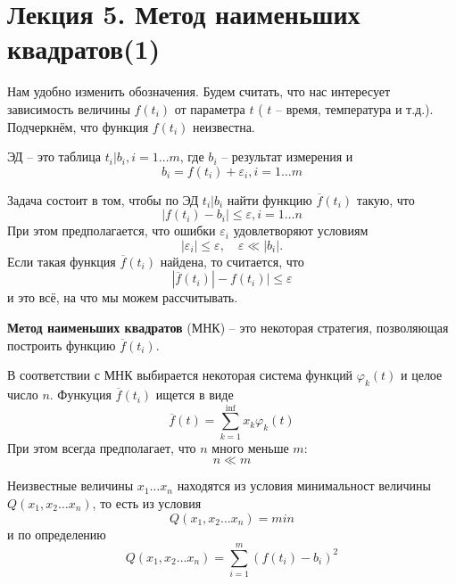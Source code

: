 \section*{Лекция 5. Метод наименьших квадратов(1)}
\label{lecture5}
Нам удобно изменить обозначения. Будем считать, что нас интересует зависимость величины $f(t_i)$ от параметра  $t$ ( $t$ -- время, температура и т.д.). Подчеркнём, что функция $f(t_i)$ неизвестна.

ЭД -- это таблица $t_i | b_i, i = 1 \dots m$, где $b_i$ -- результат измерения и 
\begin{equation}
	b_i = f(t_i) + \varepsilon_i, i = 1 \dots m
\end{equation}

Задача состоит в том, чтобы по ЭД  $t_i | b_i$ найти функцию $\overline f(t_i)$ такую, что 
\begin{equation}
	|f(t_i) - b_i| \leq \varepsilon,  i = 1 \dots n
\end{equation}
При этом предполагается, что ошибки $\varepsilon_i$ удовлетворяют условиям
\begin{equation}
	|\varepsilon_i | \leq \varepsilon , \quad \varepsilon \ll  |b_i| .
\end{equation}
Если такая функция $\overline f(t_i)$ найдена, то считается, что
\begin{equation}
	|\overline f(t_i)| - f(t_i) | \leq \varepsilon
\end{equation}
и это всё, на что мы можем рассчитывать.

\vspace{1cm}
\textbf{Метод наименьших квадратов} (МНК) --  это некоторая стратегия, позволяющая построить функцию $\overline f(t_i)$.

В соответствии с МНК выбирается некоторая система функций $\varphi_k (t) $ и целое число $n$. Функуция $\overline f(t_i)$ ищется в виде 
\begin{equation}
	\overline{f} (t) = \sum_{k=1}^\inf {x_k \varphi_k (t) }
\end{equation}
При этом всегда предполагает, что $n$ много меньше $m$:
\begin{equation}
	n \ll m
\end{equation}

Неизвестные величины $x_1 \dots x_n$ находятся из условия минимальност величины $Q(x_1, x_2 \dots x_n)$, то есть из условия
\begin{equation} \label{eq:5.7}
	Q(x_1, x_2 \dots x_n) = min
\end{equation}
и по определению
\begin{equation} 
	Q(x_1, x_2 \dots x_n) = \sum_{i=1}^m {(f(t_i) - b_i)^2}
\end{equation}

